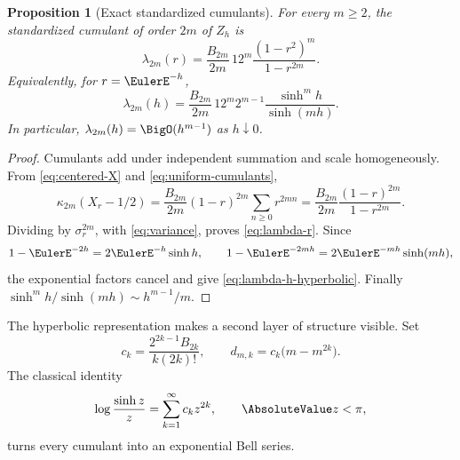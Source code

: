 \documentclass[11pt]{article}
\numberwithin{equation}{section}
\newtheorem{proposition}[theorem]{Proposition}
\theoremstyle{definition}
\begin{document}
\begin{proposition}[Exact standardized cumulants]\label{prop:exact-cumulants}
For every \(m\ge2\), the standardized cumulant of order \(2m\) of \(Z_h\) is
\begin{equation}\label{eq:lambda-r}
 \lambda_{2m}(r)
 =\frac{B_{2m}}{2m}\,12^m
  \frac{(1-r^2)^m}{1-r^{2m}}.
\end{equation}
Equivalently, for \(r=\EulerE^{-h}\),
\begin{equation}\label{eq:lambda-h-hyperbolic}
 \boxed{
 \lambda_{2m}(h)
 =\frac{B_{2m}}{2m}\,12^m2^{m-1}
  \frac{\sinh^m h}{\sinh(mh)}.}
\end{equation}
In particular, \(\lambda_{2m}(h)=\BigO(h^{m-1})\) as \(h\downarrow0\).
\end{proposition}

\begin{proof}
Cumulants add under independent summation and scale homogeneously.  From \eqref{eq:centered-X} and \eqref{eq:uniform-cumulants},
\[
 \kappa_{2m}(X_r-1/2)
 =\frac{B_{2m}}{2m}(1-r)^{2m}\sum_{n\ge0}r^{2mn}
 =\frac{B_{2m}}{2m}\frac{(1-r)^{2m}}{1-r^{2m}}.
\]
Dividing by \(\sigma_r^{2m}\), with \eqref{eq:variance}, proves \eqref{eq:lambda-r}.  Since
\[
 1-\EulerE^{-2h}=2\EulerE^{-h}\sinh h,
 \qquad
 1-\EulerE^{-2mh}=2\EulerE^{-mh}\sinh(mh),
\]
the exponential factors cancel and give \eqref{eq:lambda-h-hyperbolic}.  Finally \(\sinh^mh/\sinh(mh)\sim h^{m-1}/m\).
\end{proof}

The hyperbolic representation makes a second layer of structure visible.  Set
\begin{equation}\label{eq:ck-dmk}
 c_k=\frac{2^{2k-1}B_{2k}}{k(2k)!},
 \qquad
 d_{m,k}=c_k\bigl(m-m^{2k}\bigr).
\end{equation}
The classical identity
\begin{equation}\label{eq:log-sinh}
 \log\frac{\sinh z}{z}=\sum_{k=1}^{\infty}c_kz^{2k},
 \qquad \AbsoluteValue z<\pi,
\end{equation}
turns every cumulant into an exponential Bell series.
\end{document}
